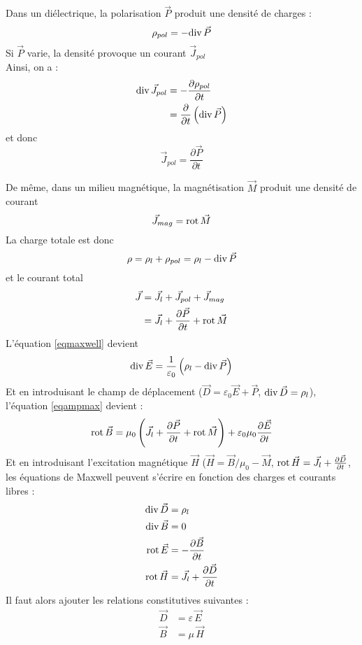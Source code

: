 \documentclass[british,french,11pt, a4paper, openany]{book}
\begin{document}
		Dans un diélectrique, la polarisation $\vec P$ produit une densité de charges :\begin{equation}
		\rho_{pol}=-\text{div}\,\vec P
		\end{equation}
		Si $\vec P$ varie, la densité provoque un courant $\vec J_{pol}$\\
		Ainsi, on a :\begin{align}
		\text{div}\,\vec J_{pol} & =-\frac{\partial \rho_{pol}}{\partial t}\\
		& =\frac{\partial}{\partial t}\left(\text{div}\,\vec P\right)
		\end{align}
		et donc\begin{equation}
		\vec J_{pol}=\frac{\partial\vec P}{\partial t}
		\end{equation}
		
		De même, dans un milieu magnétique, la magnétisation $\vec M$ produit une densité de courant \begin{equation}
		\vec J_{mag}=\text{rot}\,\vec M
		\end{equation}
		La charge totale est donc \begin{equation}
		\rho=\rho_l+\rho_{pol}=\rho_l-\text{div}\,\vec P
		\end{equation}
		et le courant total \begin{align}
		\vec J & =\vec J_l+\vec J_{pol}+\vec J_{mag}\\
		& =\vec J_l+\frac{\partial\vec P}{\partial t}+\text{rot}\,\vec M
		\end{align}
		L'équation \eqref{eqmaxwell} devient \begin{equation}
		\text{div}\,\vec E=\frac{1}{\varepsilon_0}\left(\rho_l-\text{div}\,\vec P\right)
		\end{equation}
		Et en introduisant le champ de déplacement ($\vec D=\varepsilon_0\vec E+\vec P$, $\text{div}\,\vec D=\rho_l$), l'équation \eqref{eqampmax} devient : \begin{equation}
		\text{rot}\,\vec B=\mu_0\left(\vec J_l+\frac{\partial \vec P}{\partial t}+\text{rot}\,\vec M\right)+\varepsilon_0\mu_0\frac{\partial\vec E}{\partial t}
		\end{equation}
		Et en introduisant l'excitation magnétique $\vec H$ ($\vec H=\vec B/\mu_0-\vec M$, $\text{rot}\,\vec H=\vec J_l+\frac{\partial\vec D}{\partial t}$, les équations de Maxwell peuvent s'écrire en fonction des charges et courants libres : \begin{align}
		\text{div}\,\vec D & =\rho_l\\
		\text{div}\,\vec B & =0\\
		\text{rot}\,\vec E & =-\frac{\partial\vec B}{\partial t}\\
		\text{rot}\,\vec H & =\vec J_l+\frac{\partial\vec D}{\partial t}
		\end{align}
		Il faut alors ajouter les relations constitutives suivantes :\begin{align}
		\vec D & =\varepsilon\,\vec E\\
		\vec B & = \mu\,\vec H
		\end{align}
\end{document}
